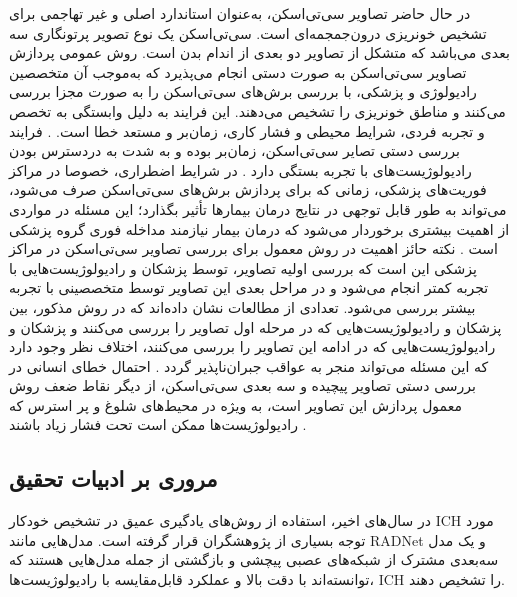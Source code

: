 در حال حاضر تصاویر سی‌تی‌اسکن، به‌عنوان استاندارد اصلی و غیر تهاجمی
برای تشخیص خونریزی‌ درون‌جمجمه‌ای است. سی‌تی‌اسکن یک نوع تصویر پرتونگاری
سه بعدی می‌باشد که متشکل از تصاویر دو بعدی از اندام بدن است. روش عمومی پردازش تصاویر سی‌تی‌اسکن به صورت دستی انجام می‌پذیرد که به‌موجب آن متخصصین رادیولوژی و پزشکی، با بررسی برش‌های
سی‌تی‌اسکن را به صورت مجزا بررسی می‌کنند و مناطق خونریزی را تشخیص می‌دهند. این فرایند به دلیل وابستگی به تخصص و تجربه فردی، شرایط محیطی و فشار کاری، زمان‌بر و مستعد خطا است. \cite{arbabshirani2018advanced,grewal2018radnet,ye2019precise,chilamkurthy2018deep,kuo2019expert}.
فرایند بررسی دستی تصایر سی‌تی‌اسکن، زمان‌بر بوده و به شدت به دردسترس بودن رادیولوژیست‌های 
با تجربه بستگی دارد \cite{burduja2020accurate}.
 در شرایط اضطراری، خصوصا در مراکز فوریت‌های پزشکی، زمانی که برای پردازش برش‌های سی‌تی‌اسکن صرف می‌شود، می‌تواند به طور قابل توجهی در نتایج درمان بیمارها تأثیر بگذارد؛ این مسئله در مواردی از اهمیت بیشتری برخوردار می‌شود که درمان بیمار نیازمند مداخله فوری  گروه پزشکی است \cite{chilamkurthy2018deep}. نکته حائز اهمیت در روش معمول برای بررسی تصاویر سی‌تی‌اسکن در مراکز پزشکی این است که بررسی اولیه تصاویر، توسط پزشکان و رادیولوژیست‌هایی با تجربه کمتر انجام می‌شود و در مراحل بعدی این تصاویر توسط متخصصینی با تجربه بیشتر بررسی می‌شود. تعدادی از مطالعات نشان داده‌اند که در روش مذکور،‌ بین پزشکان و رادیولوژیست‌هایی که در مرحله اول تصاویر را بررسی می‌کنند و پزشکان و رادیولوژیست‌هایی که در ادامه این تصاویر را بررسی می‌کنند،‌ اختلاف نظر وجود دارد که این مسئله می‌تواند منجر به عواقب جبران‌ناپذیر گردد
\cite{ye2019precise, alfaro1995accuracy, lal2000clinical, erly2002radiology, strub2007overnight}.
   احتمال خطای انسانی در بررسی دستی تصاویر پیچیده و سه بعدی سی‌تی‌اسکن، از دیگر نقاط ضعف روش معمول پردازش این تصاویر است، به ویژه در محیط‌های شلوغ و پر استرس که رادیولوژیست‌ها ممکن است تحت فشار زیاد باشند \cite{ye2019precise}.
   
\subsection*{مروری بر ادبیات تحقیق}

در سال‌های اخیر، استفاده از روش‌های یادگیری عمیق در تشخیص خودکار ICH مورد توجه بسیاری از پژوهشگران قرار گرفته است. مدل‌هایی مانند RADNet \cite{grewal2018radnet} و یک مدل سه‌بعدی مشترک از شبکه‌های عصبی پیچشی و بازگشتی \cite{ye2019precise} از جمله مدل‌هایی هستند که توانسته‌اند با دقت بالا و عملکرد قابل‌مقایسه با رادیولوژیست‌ها، ICH را تشخیص دهند.

